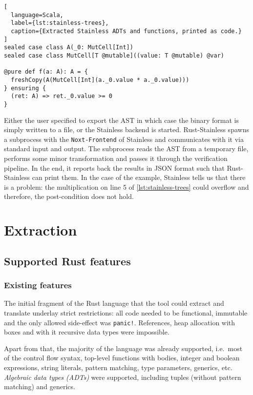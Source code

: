 \begin{lstlisting}[
  language=Scala,
  label={lst:stainless-trees},
  caption={Extracted Stainless ADTs and functions, printed as code.}
]
sealed case class A(_0: MutCell[Int])
sealed case class MutCell[T @mutable]((value: T @mutable) @var)

@pure def f(a: A): A = {
  freshCopy(A(MutCell[Int](a._0.value * a._0.value)))
} ensuring {
  (ret: A) => ret._0.value >= 0
}
\end{lstlisting}

Either the user specified to export the AST in which case the binary format is
simply written to a file, or the Stainless backend is started. Rust-Stainless
spawns a subprocess with the \passthrough{\lstinline!Noxt-Frontend!} of
Stainless and communicates with it via standard input and output. The subprocess
reads the AST from a temporary file, performs some minor transformation and
passes it through the verification pipeline. In the end, it reports back the
results in JSON format such that Rust-Stainless can print them. In the case of
the example, Stainless tells us that there is a problem: the multiplication on
line 5 of \autoref{lst:stainless-trees} could overflow and therefore, the
post-condition does not hold.



\section{Extraction}

\subsection{Supported Rust features}
\label{sec:supported-features}

\subsubsection{Existing features}

The initial fragment of the Rust language that the tool could extract
and translate underlay strict restrictions: all code needed to be
functional, immutable and the only allowed side-effect was
\passthrough{\lstinline"panic!"}. References, heap allocation with boxes
and with it recursive data types were impossible.

Apart from that, the majority of the language was already supported,
i.e.~most of the control flow syntax, top-level functions with bodies,
integer and boolean expressions, string literals, pattern matching, type
parameters, generics, etc. \emph{Algebraic data types (ADTs)} were
supported, including tuples (without pattern matching) and generics.

